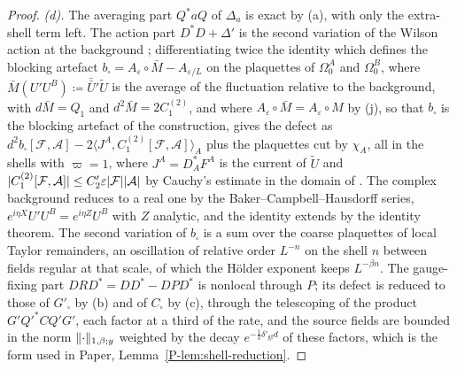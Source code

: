 \documentclass[11pt]{preprint}
\DeclarePairedDelimiter{\abs}{\lvert}{\rvert}
\DeclarePairedDelimiter{\norm}{\lVert}{\rVert}
\numberwithin{equation}{section}
\theoremstyle{definition}
\theoremstyle{remark}
\theoremstyle{plain}
\begin{document}
\begin{proof}
\emph{(d).} The averaging part $Q^*aQ$ of $\Delta_a$ \cite[(3.16), p.~393]{BalabanPBG} is exact by (a), with only the extra-shell term left. The action part $D^*D + \Delta'$ is the second variation of the Wilson action at the background \cite[(3.10)]{BalabanPBG}; differentiating twice the identity which defines the blocking artefact $b_\square = A_\varepsilon \circ \bar M - A_{\varepsilon/L}$ on the plaquettes of $\Omega^A_0$ and $\Omega^B_0$, where $\bar M(U'U^B) \coloneqq \bar{\bar U}'\tilde U$ is the average of the fluctuation relative to the background, with $d\bar M = Q_1$ and $d^2\bar M = 2C^{(2)}_1$, and where $A_\varepsilon \circ \bar M = A_\varepsilon \circ M$ by (j), so that $b_\square$ is the blocking artefact of the construction, gives the defect as $d^2b_\square[\mathcal F, \mathcal A] - 2\langle J^A, C^{(2)}_1[\mathcal F, \mathcal A]\rangle_A$ plus the plaquettes cut by $\chi_A$, all in the shells with $\varpi = 1$, where $J^A = D^*_AF^A$ is the current of $\tilde U$ \cite[(3.11)--(3.12)]{BalabanPBG} and $\abs{C^{(2)}_1[\mathcal F, \mathcal A]} \leq C'_2\varepsilon\abs{\mathcal F}\abs{\mathcal A}$ by Cauchy's estimate in the domain of \cite[(123)]{BalabanAVG}. The complex background reduces to a real one by the Baker--Campbell--Hausdorff series, $e^{i\eta X}U'U^B = e^{i\eta Z}U^B$ with $Z$ analytic, and the identity extends by the identity theorem. The second variation of $b_\square$ is a sum over the coarse plaquettes of local Taylor remainders, an oscillation of relative order $L^{-n}$ on the shell $n$ between fields regular at that scale, of which the H\"older exponent keeps $L^{-\beta n}$. The gauge-fixing part $DRD^* = DD^* - DPD^*$ \cite[p.~414]{BalabanPBG} is nonlocal through $P$; its defect is reduced to those of $G'_\square$ by (b) and of $C_\square$ by (c), through the telescoping of the product $G'Q'^*CQ'G'$, each factor at a third of the rate, and the source fields are bounded in the norm $\norm{\cdot}_{1,\beta;y}$ weighted by the decay $e^{-\frac13\delta'_{\mathrm{gf}}d}$ of these factors, which is the form used in Paper, Lemma~\ref{P-lem:shell-reduction}.


\end{proof}
\end{document}
